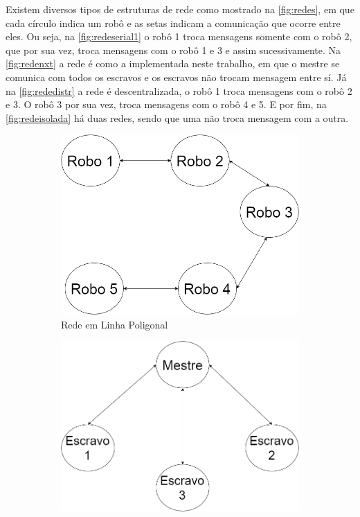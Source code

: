 Existem diversos tipos de estruturas de rede como mostrado na \autoref{fig:redes}, em que cada círculo indica um robô e as setas indicam a comunicação que ocorre entre eles. Ou seja, na \autoref{fig:redeserial1} o robô 1 troca mensagens somente com o robô 2, que por sua vez, troca mensagens com o robô 1 e 3 e assim sucessivamente. Na \autoref{fig:redenxt} a rede é como a implementada neste trabalho, em que o mestre se comunica com todos os escravos e os escravos não trocam mensagem entre sí. Já na \autoref{fig:rededistr} a rede é descentralizada, o robô 1 troca mensagens com o robô 2 e 3. O robô 3 por sua vez, troca mensagens com o robô 4 e 5. E por fim, na \autoref{fig:redeisolada} há duas redes, sendo que uma não troca mensagem com a outra.
\begin{figure}[!htb]
	\centering
	\begin{subfigure}{.5\textwidth}
		\centering
		\includegraphics[width=.9\linewidth]{./04-figuras/RedeSerial}
		\caption{Rede em Linha Poligonal}
		\label{fig:redeserial1}
	\end{subfigure}%
	\begin{subfigure}{.5\textwidth}
		\centering
		\includegraphics[width=.9\linewidth]{./04-figuras/RedeNXC}

\end{subfigure}
\end{figure}

